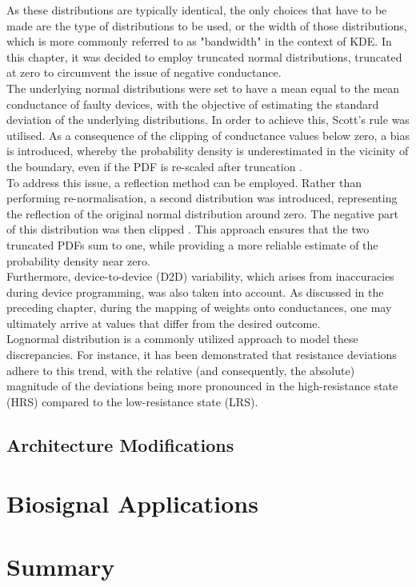 \noindent As these distributions are typically identical, the only choices that have to be made are the type of distributions to be used, or the width of those distributions, which is more commonly referred to as "bandwidth" \cite{turlach1993bandwidth} in the context of KDE. In this chapter, it was decided to employ truncated normal distributions, truncated at zero to circumvent the issue of negative conductance. \\

\noindent The underlying normal distributions were set to have a mean equal to the mean conductance of faulty devices, with the objective of estimating the standard deviation of the underlying distributions. In order to achieve this, Scott's rule \cite{scott2015multivariate} was utilised. As a consequence of the clipping of conductance values below zero, a bias is introduced, whereby the probability density is underestimated in the vicinity of the boundary, even if the PDF is re-scaled after truncation \cite{silverman2018density}. \\

\noindent To address this issue, a reflection method can be employed. Rather than performing re-normalisation, a second distribution was introduced, representing the reflection of the original normal distribution around zero. The negative part of this distribution was then clipped \cite{jones1993simple}. This approach ensures that the two truncated PDFs sum to one, while providing a more reliable estimate of the probability density near zero.\\

\noindent Furthermore, device-to-device (D2D) variability, which arises from inaccuracies during device programming, was also taken into account. As discussed in the preceding chapter, during the mapping of weights onto conductances, one may ultimately arrive at values that differ from the desired outcome. \\

\noindent Lognormal distribution is a commonly utilized approach to model these discrepancies. For instance, it has been demonstrated that resistance deviations adhere to this trend, with the relative (and consequently, the absolute) magnitude of the deviations being more pronounced in the high-resistance state (HRS) compared to the low-resistance state (LRS).

\subsection{Architecture Modifications}

\section[Biosignal Applications]{Biosignal Applications}

\section[Summary]{Summary}